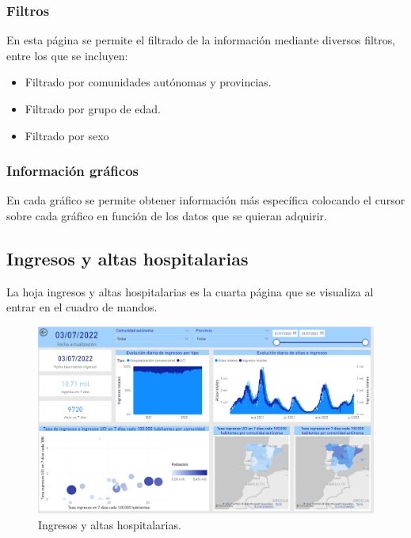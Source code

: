 \subsubsection{Filtros}
En esta página se permite el filtrado de la información mediante diversos filtros, entre los que se incluyen:
\begin{itemize}
    \item Filtrado por comunidades autónomas y provincias.
    \item Filtrado por grupo de edad.
    \item Filtrado por sexo
\end{itemize}

\subsubsection{Información gráficos}
En cada gráfico se permite obtener información más específica colocando el cursor sobre cada gráfico en función de los datos que se quieran adquirir.

\subsection{Ingresos y altas hospitalarias}
La hoja ingresos y altas hospitalarias es la cuarta página que se visualiza al entrar en el cuadro de mandos.

\begin{figure}[h]
    \advance\leftskip-0.5cm 
    \includegraphics[scale=0.55]{img/powerBI_ingresosYaltas.PNG}
    \caption{Ingresos y altas hospitalarias.}
\end{figure}
\newpage

